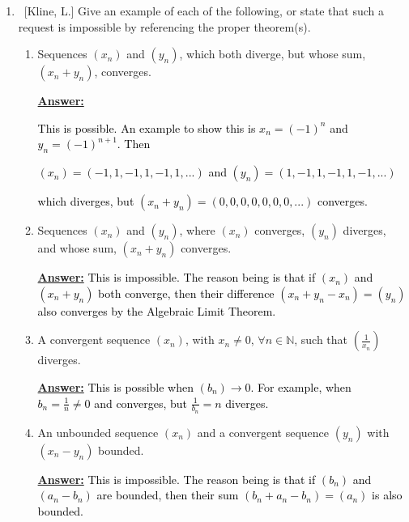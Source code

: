 \documentclass[10pt]{article}
\begin{document}
\begin{enumerate}
\begin{proof}
\begin{center}
 $a - \epsilon < x_n \leq y_n \leq  z_n < a + \epsilon$,
 
 \end{center}
 which implies that $a - \epsilon \leq y_n \leq  a + \epsilon$, or $|y_n-a| < \epsilon$.
 \end{proof}
	
\item  ~[Kline, L.] Give an example of each of the following, or state that such a request is impossible by referencing the proper theorem(s).

	\begin{enumerate}
	
	\item  Sequences $(x_n)$ and $(y_n)$, which both diverge, but whose sum, $(x_n+y_n)$, converges.
 
 \textbf{\underline{Answer:}}
  \textcolor{black}{This is possible.  An example to show this is $x_n = (-1)^n$ and $y_n=(-1)^{n+1}$.  Then
  \begin{center}
  $(x_n)=(-1, 1, -1, 1, -1, 1,...)$
  and
  $(y_n) = (1, -1, 1, -1, 1, -1,...)$
  \end{center}
  which diverges, but $(x_n+y_n) = (0, 0, 0, 0, 0, 0, 0,...)$ converges.}

	\item  Sequences $(x_n)$ and $(y_n)$, where $(x_n)$ converges, $(y_n)$ diverges, and whose sum, $(x_n+y_n)$ converges. 
 
 \textbf{\underline{Answer:}}
 \textcolor{black}{This is impossible.  The reason being is that if $(x_n)$ and $(x_n+y_n)$ both converge, then their difference $(x_n+y_n-x_n)=(y_n)$ also converges by the Algebraic Limit Theorem.}

	\item  A convergent sequence $(x_n)$, with $x_n \neq 0$, $\forall n \in \mathbb{N}$, such that $\left( \frac{1}{x_n} \right)$ diverges.

 \textbf{\underline{Answer:}}
 \textcolor{black}{This is possible when $(b_n) \rightarrow 0$.  For example, when $b_n = \frac{1}{n} \neq 0$ and converges, but $\frac{1}{b_n}=n$ diverges.
  }

	\item An unbounded sequence $(x_n)$ and a convergent sequence $(y_n)$ with $(x_n - y_n)$ bounded. 

 \textbf{\underline{Answer:}}
  \textcolor{black}{This is impossible.  The reason being is that if $(b_n)$ and $(a_n-b_n)$ are bounded, then their sum $(b_n+a_n-b_n)=(a_n)$ is also bounded.
  }


\end{enumerate}
\end{enumerate}
\end{document}
